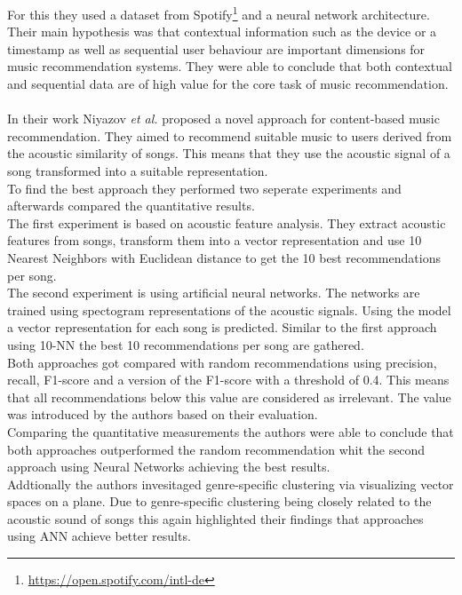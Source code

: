 \documentclass[runningheads,a4paper]{llncs}
\begin{document}
For this they used a dataset from Spotify\footnote{\url{https://open.spotify.com/intl-de}} and a neural network architecture. \\
Their main hypothesis was that contextual information such as the device or a timestamp as well as sequential user behaviour are 
 important dimensions for music recommendation systems.
They were able to conclude that both contextual and sequential data are of high value for the core task of music recommendation. 
\cite{hansen2020contextual}\\
\\
In their work Niyazov \textit{et al.} proposed a novel approach for content-based music recommendation. 
They aimed to recommend suitable music to users derived from the acoustic similarity of songs.
This means that they use the acoustic signal of a song transformed into a suitable representation. \\
To find the best approach they performed two seperate experiments and afterwards compared the quantitative results.\\
The first experiment is based on acoustic feature analysis. 
They extract acoustic features from songs, transform them into a vector representation and use 10 Nearest Neighbors with Euclidean distance 
to get the 10 best recommendations per song. \\
The second experiment is using artificial neural networks. 
The networks are trained using spectogram representations of the acoustic signals.
Using the model a vector representation for each song is predicted. 
Similar to the first approach using 10-NN the best 10 recommendations per song are gathered. \\
Both approaches got compared with random recommendations using precision, recall, F1-score and a version of the F1-score with a threshold of 0.4.
This means that all recommendations below this value are considered as irrelevant. The value was introduced by the authors based on their evaluation.\\
Comparing the quantitative measurements the authors were able to conclude that both approaches outperformed the random recommendation
whit the second approach using Neural Networks achieving the best results. \\
Addtionally the authors invesitaged genre-specific clustering via visualizing vector spaces on a plane. 
Due to genre-specific clustering being closely related to the acoustic sound of songs this again highlighted their findings that approaches 
using ANN achieve better results. \cite{niyazov2021content}\\
\end{document}
